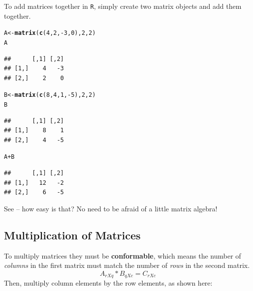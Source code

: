 \documentclass[11pt,openany]{book}\usepackage[]{graphicx}\usepackage[]{color}
\makeatletter
\newcommand{\hlnum}[1]{\textcolor[rgb]{0.686,0.059,0.569}{#1}}%
\newcommand{\hlopt}[1]{\textcolor[rgb]{0,0,0}{#1}}%
\newcommand{\hlstd}[1]{\textcolor[rgb]{0.345,0.345,0.345}{#1}}%
\newcommand{\hlkwb}[1]{\textcolor[rgb]{0.69,0.353,0.396}{#1}}%
\newcommand{\hlkwd}[1]{\textcolor[rgb]{0.737,0.353,0.396}{\textbf{#1}}}%
\newenvironment{kframe}{%
 \def\at@end@of@kframe{}%
 \ifinner\ifhmode%
  \def\at@end@of@kframe{\end{minipage}}%
  \begin{minipage}{\columnwidth}%
 \fi\fi%
 \def\FrameCommand##1{\hskip\@totalleftmargin \hskip-\fboxsep
 \colorbox{shadecolor}{##1}\hskip-\fboxsep
     \hskip-\linewidth \hskip-\@totalleftmargin \hskip\columnwidth}%
 \MakeFramed {\advance\hsize-\width
   \@totalleftmargin\z@ \linewidth\hsize
   \@setminipage}}%
 {\par\unskip\endMakeFramed%
 \at@end@of@kframe}
\newenvironment{knitrout}{}{} %
\renewenvironment{knitrout}{\begin{singlespace}}{\end{singlespace}}
\makeatother
\begin{document}
\noindent 
To add matrices together in \texttt{R}, simply create two matrix objects and add them together. 
\begin{knitrout}
\color{fgcolor}\begin{kframe}
\begin{alltt}
\hlstd{A} \hlkwb{<-} \hlkwd{matrix}\hlstd{(}\hlkwd{c}\hlstd{(}\hlnum{4}\hlstd{,} \hlnum{2}\hlstd{,} \hlopt{-}\hlnum{3}\hlstd{,} \hlnum{0}\hlstd{),} \hlnum{2}\hlstd{,} \hlnum{2}\hlstd{)}
\hlstd{A}
\end{alltt}
\begin{verbatim}
##      [,1] [,2]
## [1,]    4   -3
## [2,]    2    0
\end{verbatim}
\begin{alltt}
\hlstd{B} \hlkwb{<-} \hlkwd{matrix}\hlstd{(}\hlkwd{c}\hlstd{(}\hlnum{8}\hlstd{,} \hlnum{4}\hlstd{,} \hlnum{1}\hlstd{,} \hlopt{-}\hlnum{5}\hlstd{),} \hlnum{2}\hlstd{,} \hlnum{2}\hlstd{)}
\hlstd{B}
\end{alltt}
\begin{verbatim}
##      [,1] [,2]
## [1,]    8    1
## [2,]    4   -5
\end{verbatim}
\begin{alltt}
\hlstd{A} \hlopt{+} \hlstd{B}
\end{alltt}
\begin{verbatim}
##      [,1] [,2]
## [1,]   12   -2
## [2,]    6   -5
\end{verbatim}
\end{kframe}
\end{knitrout}

\noindent 
See -- how easy is that? No need to be afraid of a little matrix algebra!

\subsection{Multiplication of Matrices}

To multiply matrices they must be \textbf{conformable}, which means the number of \textit{columns} in the first matrix must 
match the number of \textit{rows} in the second matrix. 
\begin{equation*}
A_{rXq} * B_{qXc} = C_{rXc}
\end{equation*}
Then, multiply column elements by the row elements, as shown here: 
\end{document}
